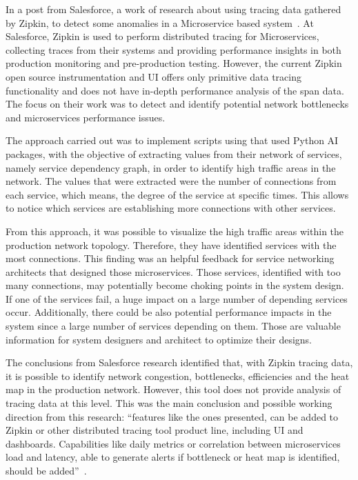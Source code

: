In a post from Salesforce, a work of research about using tracing data gathered by Zipkin, to detect some anomalies in a Microservice based system~\cite{anomaly_detection_zipkin_tracing_data}. At Salesforce, Zipkin is used to perform distributed tracing for Microservices, collecting traces from their systems and providing performance insights in both production monitoring and pre-production testing. However, the current Zipkin open source instrumentation and UI offers only primitive data tracing functionality and does not have in-depth performance analysis of the span data. The focus on their work was to detect and identify potential network bottlenecks and microservices performance issues.

The approach carried out was to implement scripts using that used Python AI packages, with the objective of extracting values from their network of services, namely service dependency graph, in order to identify high traffic areas in the network. The values that were extracted were the number of connections from each service, which means, the degree of the service at specific times. This allows to notice which services are establishing more connections with other services.

From this approach, it was possible to visualize the high traffic areas within the production network topology. Therefore, they have identified services with the most connections. This finding was an helpful feedback for service networking architects that designed those microservices. Those services, identified with too many connections, may potentially become choking points in the system design. If one of the services fail, a huge impact on a large number of depending services occur. Additionally, there could be also potential performance impacts in the system since a large number of services depending on them. Those are valuable information for system designers and architect to optimize their designs.

The conclusions from Salesforce research identified that, with Zipkin tracing data, it is possible to identify network congestion, bottlenecks, efficiencies and the heat map in the production network. However, this tool does not provide analysis of tracing data at this level. This was the main conclusion and possible working direction from this research: ``features like the ones presented, can be added to Zipkin or other distributed tracing tool product line, including UI and dashboards. Capabilities like daily metrics or correlation between microservices load and latency, able to generate alerts if bottleneck or heat map is identified, should be added''~\cite{anomaly_detection_zipkin_tracing_data}.


